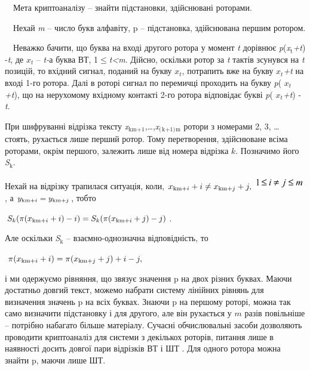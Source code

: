 \documentclass[a4paper]{article}
\newcommand\textsubscript[1]{\ensuremath{{}_{\text{#1}}}}
\newcounter{}
\newcommand\normalsubformula[1]{\text{\mathversion{normal}$#1$}}
\begin{document}
\ \ Мета криптоаналізу – знайти підстановки, здійснювані роторами.

\ \ Нехай \textit{m} – число букв алфавіту, \textgreek{p – }підстановка,
здійснювана першим ротором.

\ \ Неважко бачити, що буква на вході другого ротора у момент \textit{t}
дорівнює
\textit{\textgreek{p}}(\textit{x}\textit{\textsubscript{t}}\textit{+}\textit{t})
-\textit{t}, де   ${x_{{t}}}$ – \textit{t}\textit{{}-}а\textit{ }буква ВТ,
1${\leq}$\textit{t}\textit{{\textless}}\textit{m}. Дійсно, оскільки ротор за
\textit{t}\textit{ }тактів зсунувся на \textit{t}\textit{ }позицій, то вхідний
сигнал, поданий на букву ${x_{{t}}}$, потрапить вже на букву 
${x_{{t}}}$\textit{+t }на вході 1-го ротора. Далі в роторі сигнал по перемичці
проходить на букву \textit{\textgreek{p}}( ${x_{{t}}}$\textit{+}\textit{t}), що
на нерухомому вхідному контакті 2-го ротора відповідає букві
\textit{\textgreek{p}}( ${x_{{t}}}$\textit{+}\textit{t}) -\textit{t}. 

При шифруванні відрізка тексту
\textit{x}\textit{\textsubscript{km}}\textsubscript{+1},…,\textit{x}\textit{\textsubscript{(}}\textit{\textsubscript{k}}\textit{\textsubscript{+1)}}\textit{\textsubscript{m}}
ротори з номерами  2, 3, … стоять, рухається лише перший ротор. Тому
перетворення, здійснюване всіма роторами, окрім першого, залежить лише від
номера відрізка  ${k}$. Позначимо його \textit{S}\textit{\textsubscript{k}}.

Нехай на відрізку трапилася ситуація, коли, 
${x_{{\normalsubformula{\text{km}}+i}}+i\neq
x_{{\normalsubformula{\text{km}}+j}}+j,}$ 
\includegraphics[width=0.861in,height=0.222in]{crypt-img/crypt-img80.png} , а 
${y_{{\normalsubformula{\text{km}}+i}}=y_{{\normalsubformula{\text{km}}+j}}}$,
тобто

{\centering
 ${S_{{k}}(\pi (x_{{\normalsubformula{\text{km}}+i}}+i)-i)=S_{{k}}(\pi
(x_{{\normalsubformula{\text{km}}+i}}+j)-j)}$.
\par}

Але оскільки \textit{S}\textit{\textsubscript{k}} – взаємно{}-однозначна
відповідність, то

{\centering  $ $ ${\pi (x_{{\normalsubformula{\text{km}}+i}}+i)=\pi
(x_{{\normalsubformula{\text{km}}+j}}+j)+i-j,}$\par}

і ми одержуємо рівняння, що зв{\textquotesingle}язує значення  \textgreek{p }на
двох різних буквах. Маючи достатньо довгий текст, можемо набрати систему
лінійних рівнянь для визначення значень \textgreek{p }на всіх буквах. Знаючи
\textgreek{p }на першому роторі, можна так само визначити підстановку і для
другого, але він рухається у  ${m}$ разів повільніше – потрібно набагато більше
матеріалу. Сучасні обчислювальні засоби дозволяють проводити криптоаналіз для
системи з декількох роторів, питання лише в наявності досить довгої пари
відрізків ВТ і ШТ . Для одного ротора можна знайти \textgreek{p, }маючи лише
ШТ.
\end{document}
